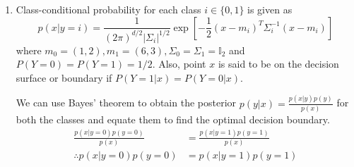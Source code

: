 \begin{enumerate}

	\item 
		Class-conditional probability for each class $i \in \{0, 1\}$ is given as 
		$$p(x | y = i) = \frac{1}{(2\pi)^{d / 2} |\Sigma_{i}|^{1 / 2} } \exp{\left[ -\frac{1}{2}(x - m_{i})^{T} \Sigma_{i}^{-1} (x - m_{i}) \right]}$$
		where $m_{0} = (1, 2), m_{1} = (6, 3), \Sigma_{0} = \Sigma_{1} = \mathbb{I}_{2}$ and $P(Y= 0) = P(Y = 1) = 1 / 2$. Also, point $x$ is said to be on the decision surface or boundary if $P(Y = 1 | x) = P(Y = 0 | x)$. 
		
		We can use Bayes' theorem to obtain the posterior $p(y | x) = \frac{p(x | y)p(y)}{p(x)}$ for both the classes and equate them to find the optimal decision boundary.
		\begin{align*}
			\frac{p(x | y = 0)p(y = 0)}{p(x)} & = \frac{p(x | y = 1)p(y = 1)}{p(x)} \\			\therefore p(x | y = 0)p(y = 0) & = p(x | y = 1)p(y = 1) \\
			
		\end{align*} 

\end{enumerate}